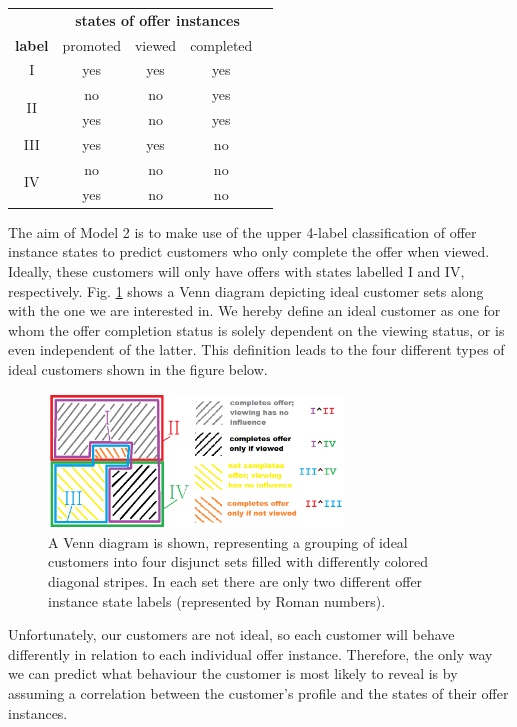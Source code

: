 \documentclass[11pt]{article} %
\begin{document}
\begin{center}
{\Large
\begin{tabular}{|c||c|c|c|c|}
 \hline
&\multicolumn{3}{c|}{  \textbf{states of offer instances}}\\
 \textbf{label} & promoted & viewed & completed \\ 
\hline
\hline
I & yes & yes & yes \\ 
\hline
\multirow{ 2}{*}{II} & no & no & yes \\ 
 & yes & no & yes \\ 
\hline
III & yes & yes & no \\ 
\hline
\multirow{ 2}{*}{IV} &no & no & no \\ 
 & yes & no & no \\ 
 \hline
\end{tabular}
}
\end{center}

The aim of Model 2 is to make use of the upper 4-label classification of offer instance states to predict customers who only complete the offer when viewed.
Ideally, these customers will only have offers with states labelled I and IV, respectively. Fig. \ref{fig:venn2} shows a Venn diagram depicting ideal customer sets along with the one we are interested in. We hereby define an ideal customer as one for whom the offer completion status is solely dependent on the viewing status, or is even independent of the latter.
This definition leads to the four different types of ideal customers shown in the figure below.
\begin{figure}[H]
\begin{center}
\includegraphics[width=0.7\textwidth]{venn_diagram2.png}
\caption{\label{fig:venn2}A Venn diagram is shown, representing a grouping of ideal customers into four disjunct sets filled with differently colored diagonal stripes. In each set there are only two different offer instance state labels (represented by Roman numbers). 
}
\end{center}
\end{figure}

Unfortunately, our customers are not ideal, so each customer will behave differently in relation to each individual offer instance.
Therefore, the only way we can predict what behaviour the customer is most likely to reveal is by assuming a correlation between the customer's profile and the states of their offer instances.
\end{document}
